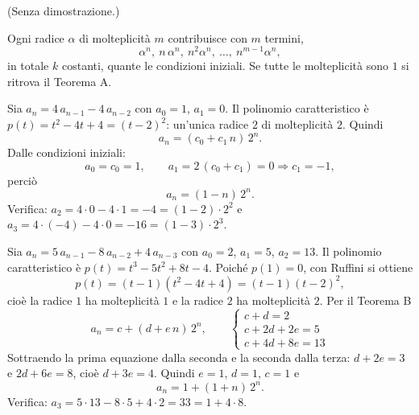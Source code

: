 \documentclass[11pt,a4paper]{article}
\begin{document}
(Senza dimostrazione.)

\begin{osservazione}
Ogni radice $\alpha$ di molteplicità $m$ contribuisce con $m$ termini,
\[
  \alpha^n,\ n\,\alpha^n,\ n^2\alpha^n,\ \dots,\ n^{m-1}\alpha^n ,
\]
in totale $k$ costanti, quante le condizioni iniziali. Se tutte le molteplicità
sono $1$ si ritrova il Teorema A.
\end{osservazione}

\begin{esempio}
Sia $a_n = 4\, a_{n-1} - 4\, a_{n-2}$ con $a_0 = 1$, $a_1 = 0$. Il polinomio
caratteristico è $p(t) = t^2 - 4t + 4 = (t - 2)^2$: un'unica radice $2$ di
molteplicità $2$. Quindi
\[
  a_n = (c_0 + c_1\, n)\, 2^n .
\]
Dalle condizioni iniziali:
\[
  a_0 = c_0 = 1 , \qquad a_1 = 2\,(c_0 + c_1) = 0 \Rightarrow c_1 = -1 ,
\]
perciò
\[
  a_n = (1 - n)\, 2^n .
\]
Verifica: $a_2 = 4 \cdot 0 - 4 \cdot 1 = -4 = (1-2)\cdot 2^2$ e
$a_3 = 4\cdot(-4) - 4 \cdot 0 = -16 = (1-3)\cdot 2^3$.
\end{esempio}

\begin{esempio}
Sia $a_n = 5\, a_{n-1} - 8\, a_{n-2} + 4\, a_{n-3}$ con $a_0 = 2$, $a_1 = 5$,
$a_2 = 13$. Il polinomio caratteristico è $p(t) = t^3 - 5t^2 + 8t - 4$.
Poiché $p(1) = 0$, con Ruffini si ottiene
\[
  p(t) = (t - 1)(t^2 - 4t + 4) = (t - 1)(t - 2)^2 ,
\]
cioè la radice $1$ ha molteplicità $1$ e la radice $2$ ha molteplicità $2$.
Per il Teorema B
\[
  a_n = c + (d + e\, n)\, 2^n ,
  \qquad
  \begin{cases}
    c + d = 2 \\
    c + 2d + 2e = 5 \\
    c + 4d + 8e = 13
  \end{cases}
\]
Sottraendo la prima equazione dalla seconda e la seconda dalla terza:
$d + 2e = 3$ e $2d + 6e = 8$, cioè $d + 3e = 4$. Quindi $e = 1$, $d = 1$,
$c = 1$ e
\[
  a_n = 1 + (1 + n)\, 2^n .
\]
Verifica: $a_3 = 5 \cdot 13 - 8 \cdot 5 + 4 \cdot 2 = 33 = 1 + 4 \cdot 8$.
\end{esempio}
\end{document}
